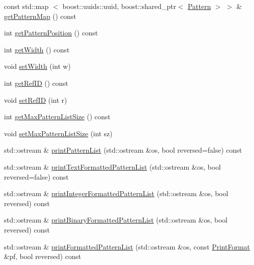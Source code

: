 \begin{DoxyCompactItemize}
\item 
const std\-::map\*
$<$ boost\-::uuids\-::uuid, \*
boost\-::shared\-\_\-ptr$<$ \hyperlink{classcryomesh_1_1state_1_1Pattern}{\-Pattern} $>$ $>$ \& \hyperlink{classcryomesh_1_1state_1_1PatternChannel_ab3bc796775ce23366a18206ac2c5119d}{get\-Pattern\-Map} () const 
\item 
int \hyperlink{classcryomesh_1_1state_1_1PatternChannel_a930bbb05180ecd22aa9a87eb62daba0f}{get\-Pattern\-Position} () const 
\item 
int \hyperlink{classcryomesh_1_1state_1_1PatternChannel_a1b02b011f6abc75354e75fe44218190d}{get\-Width} () const 
\item 
void \hyperlink{classcryomesh_1_1state_1_1PatternChannel_ae9f396f25c1f9650cc57b4c02c84a5f3}{set\-Width} (int w)
\item 
int \hyperlink{classcryomesh_1_1state_1_1PatternChannel_a6d02f9db85383449d208ebb012edbe48}{get\-Ref\-I\-D} () const 
\item 
void \hyperlink{classcryomesh_1_1state_1_1PatternChannel_a8df9a6aace2cf6810d3d6f3bc72b5a3b}{set\-Ref\-I\-D} (int r)
\item 
int \hyperlink{classcryomesh_1_1state_1_1PatternChannel_a6c1ae5242c32abd71055d35c7d126bfa}{get\-Max\-Pattern\-List\-Size} () const 
\item 
void \hyperlink{classcryomesh_1_1state_1_1PatternChannel_acd69920f539ac7a7149faa92c5e766e1}{set\-Max\-Pattern\-List\-Size} (int sz)
\item 
std\-::ostream \& \hyperlink{classcryomesh_1_1state_1_1PatternChannel_a74a37c66904647c83d459ee4a90446d7}{print\-Pattern\-List} (std\-::ostream \&os, bool reversed=false) const 
\item 
std\-::ostream \& \hyperlink{classcryomesh_1_1state_1_1PatternChannel_a1ab67f8d6565a4a2b987152d4c38d175}{print\-Text\-Formatted\-Pattern\-List} (std\-::ostream \&os, bool reversed=false) const 
\item 
std\-::ostream \& \hyperlink{classcryomesh_1_1state_1_1PatternChannel_a8d92b898f11a8cea38022bf888807c69}{print\-Integer\-Formatted\-Pattern\-List} (std\-::ostream \&os, bool reversed) const 
\item 
std\-::ostream \& \hyperlink{classcryomesh_1_1state_1_1PatternChannel_aa6d23443589ea223baed8eb9042a2139}{print\-Binary\-Formatted\-Pattern\-List} (std\-::ostream \&os, bool reversed) const 
\item 
std\-::ostream \& \hyperlink{classcryomesh_1_1state_1_1PatternChannel_a4813e35ef5321611b83d523c5cc3bfb6}{print\-Formatted\-Pattern\-List} (std\-::ostream \&os, const \hyperlink{classcryomesh_1_1state_1_1PatternChannel_aecb6feb12b771abb3cca4a77f5a47903}{\-Print\-Format} \&pf, bool reversed) const 
\end{DoxyCompactItemize}
